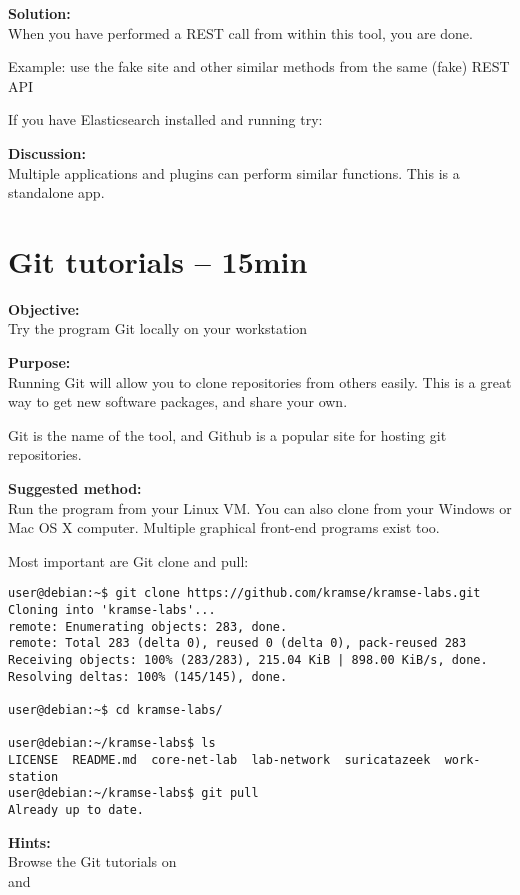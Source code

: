 \documentclass[a4paper,11pt,notitlepage]{report}
\begin{document}
{\bf Solution:}\\
When you have performed a REST call from within this tool, you are done.

Example: use the fake site  and other similar methods from the same (fake) REST API

If you have Elasticsearch installed and running try: 

{\bf Discussion:}\\
Multiple applications and plugins can perform similar functions. This is a standalone app.


\chapter{Git tutorials -- 15min}
\label{ex:git-tutorial}



{\bf Objective:}\\
Try the program Git locally on your workstation

{\bf Purpose:}\\
Running Git will allow you to clone repositories from others easily. This is a great way to get new software packages, and share your own.

Git is the name of the tool, and Github is a popular site for hosting git repositories.

{\bf Suggested method:}\\
Run the program from your Linux VM. You can also clone from your Windows or Mac OS X computer. Multiple graphical front-end programs exist too.

Most important are Git clone and pull:
\begin{verbatim}
user@debian:~$ git clone https://github.com/kramse/kramse-labs.git
Cloning into 'kramse-labs'...
remote: Enumerating objects: 283, done.
remote: Total 283 (delta 0), reused 0 (delta 0), pack-reused 283
Receiving objects: 100% (283/283), 215.04 KiB | 898.00 KiB/s, done.
Resolving deltas: 100% (145/145), done.

user@debian:~$ cd kramse-labs/

user@debian:~/kramse-labs$ ls
LICENSE  README.md  core-net-lab  lab-network  suricatazeek  work-station
user@debian:~/kramse-labs$ git pull
Already up to date.
\end{verbatim}

{\bf Hints:}\\
Browse the Git tutorials on \\
and 
\end{document}
